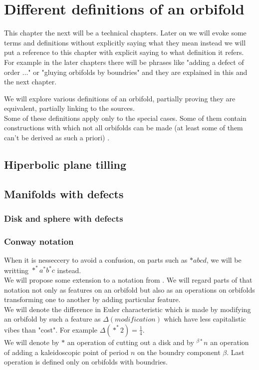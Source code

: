 \chapter{Different definitions of an orbifold}

This chapter the next will be a technical chapters. Later on we will evoke some terms and 
definitions without 
explicitly saying what they mean instead we will put a reference to this chapter with explicit 
saying to what definition it refers. \\
For example in the later chapters there will be phrases like "adding a defect of order $\dots$" or 
"gluying orbifolds by boundries" and they are explained in this and the next chapter.
 

We will explore various definitions of an orbifold, partially proving they are equivalent, partially 
linking to the sources. \\
Some of these definitions apply only to the special cases. Some of them contain constructions 
with which not all orbifolds can be made (at least some of them can't be derived as such a priori)
. \\

\section{Hiperbolic plane tilling}

\section{Manifolds with defects}
\subsection{Disk and sphere with defects}\label{Disk_and_sphere_with_defects}



\subsection{Conway notation}
\cite{Conway2008}

When it is nesseccery to avoid a confusion, on parts such as $*abcd$, we will be writting 
$*^*a^*b^*c$ instead. \\
We will propose some extension to a notation from \cite{Conway2008}.
We will regard parts of that notation not only as features on an orbifold but also as an operations 
on orbifolds transforming one to another by adding particular feature. \\
We will denote the difference in Euler characteristic which is made by modifying 
an orbifold by such a feature as $\Delta(modification)$ 
which have less capitalistic vibes than "cost". 
For example $\Delta(*^*2) = \frac{1}{4}$. \\
We will denote by $*$ an operation of cutting out a disk and by $^{\beta*}n$ an operation of 
adding a kaleidoscopic point of period $n$ on the boundry component $\beta$. 
Last operation is defined only on orbifolds with boundries.


